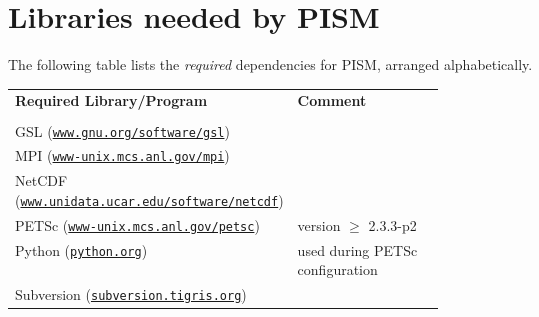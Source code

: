 \documentclass[11pt,final]{amsart}
\newcommand{\PETSCREL}{2.3.3-p2}
\newcommand{\normalspacing}{\renewcommand{\baselinestretch}{1.1}\tiny\normalsize}
\renewcommand{\t}[1]{\texttt{#1}}
\begin{document}
\clearpage
\section{Libraries needed by PISM}
\label{sec:prerequisites}

\bigskip
The following table lists the \emph{required} dependencies for PISM, arranged alphabetically.
\bigskip
\newcommand{\fattablespacing}{\renewcommand{\baselinestretch}{1.5}\tiny\normalsize}

\fattablespacing
\newcommand\pairstack[2]{#1 \quad (\small#2\normalsize)}
\begin{center}
\begin{tabular*}{1.0\linewidth}{lp{0.5\linewidth}}\hline
  \textbf{Required Library/Program} & \textbf{Comment} \\
  &  \\
  \pairstack{GSL}{\href{http://www.gnu.org/software/gsl/}{\t{www.gnu.org/software/gsl}}}  &  \\
  \pairstack{MPI}{\href{http://www-unix.mcs.anl.gov/mpi/}{\t{www-unix.mcs.anl.gov/mpi}}}  & \\
  \pairstack{NetCDF}{\href{http://www.unidata.ucar.edu/software/netcdf/}{\t{www.unidata.ucar.edu/software/netcdf}}}  & \\
  \pairstack{PETSc}{\href{http://www-unix.mcs.anl.gov/petsc/petsc-as/}{\t{www-unix.mcs.anl.gov/petsc}}}  & version $\ge$ \PETSCREL \\
  \pairstack{Python}{\href{http://python.org/}{\t{python.org}}}  & used during PETSc configuration \\
  \pairstack{Subversion}{\href{http://subversion.tigris.org/}{\t{subversion.tigris.org}}}  & \\ 
  \hline
\end{tabular*}
\end{center}
\normalspacing
\end{document}
